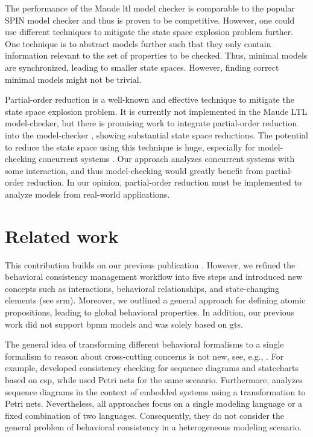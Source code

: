 \documentclass{jot}
\begin{document}
The performance of the Maude \gls*{ltl} model checker is comparable to the popular SPIN model checker \cite{ekerMaudeLTLModel2004} and thus is proven to be competitive.
However, one could use different techniques to mitigate the state space explosion problem further.
One technique is to abstract models further such that they only contain information relevant to the set of properties to be checked.
Thus, minimal models are synchronized, leading to smaller state spaces.
However, finding correct minimal models might not be trivial.

Partial-order reduction is a well-known and effective technique to mitigate the state space explosion problem.
It is currently not implemented in the Maude LTL model-checker, but there is promising work to integrate partial-order reduction into the model-checker \cite{farzanPartialOrderReduction2007}, showing substantial state space reductions.
The potential to reduce the state space using this technique is huge, especially for model-checking concurrent systems \cite{clarkeHandbookModelChecking2018}.
Our approach analyzes concurrent systems with some interaction, and thus model-checking would greatly benefit from partial-order reduction.
In our opinion, partial-order reduction must be implemented to analyze models from real-world applications.




\section{Related work} \label{sec:related_work}
This contribution builds on our previous publication \cite{krauterBehavioralConsistencyHeterogeneous2021}.
However, we refined the behavioral consistency management workflow into five steps and introduced new concepts such as interactions, behavioral relationships, and state-changing elements (see \gls*{srm}).
Moreover, we outlined a general approach for defining atomic propositions, leading to global behavioral properties.
In addition, our previous work did not support \gls*{bpmn} models and was solely based on \gls*{gt}s.

The general idea of transforming different behavioral formalisms to a single formalism to reason about cross-cutting concerns is not new, see, e.g., \cite{engelsMethodologySpecifyingAnalyzing2001}.
For example, \cite{kusterExplicitBehavioralConsistency2003} developed consistency checking for sequence diagrams and statecharts based on \gls*{csp}, while \cite{yaoConsistencyCheckingUML2006} used Petri nets for the same scenario.
Furthermore, \cite{cunhaFormalVerificationUML2011} analyzes sequence diagrams in the context of embedded systems using a transformation to Petri nets.
Nevertheless, all approaches focus on a single modeling language or a fixed combination of two languages.
Consequently, they do not consider the general problem of behavioral consistency in a heterogeneous modeling scenario.
\end{document}
